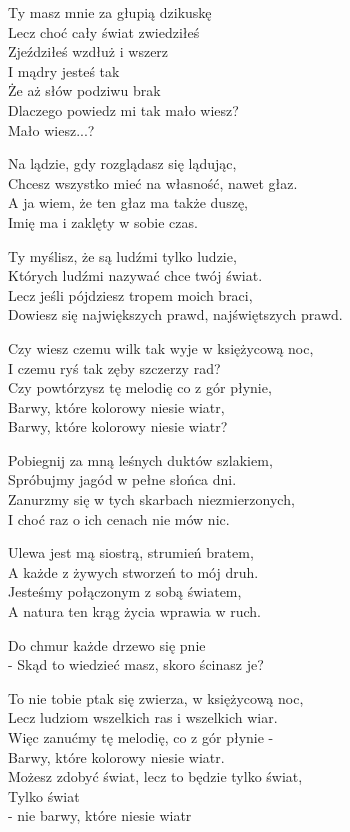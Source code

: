\begin{text}
    Ty masz mnie za głupią dzikuskę\\
    Lecz choć cały świat zwiedziłeś\\
    Zjeździłeś wzdłuż i wszerz\\
    I mądry jesteś tak\\
    Że aż słów podziwu brak\\
    Dlaczego powiedz mi tak mało wiesz?\\
    Mało wiesz...?

    Na lądzie, gdy rozglądasz się lądując,\\
    Chcesz wszystko mieć na własność, nawet głaz.\\
    A ja wiem, że ten głaz ma także duszę,\\
    Imię ma i zaklęty w sobie czas.

    Ty myślisz, że są ludźmi tylko ludzie,\\
    Których ludźmi nazywać chce twój świat.\\
    Lecz jeśli pójdziesz tropem moich braci,\\
    Dowiesz się największych prawd, najświętszych prawd.

    Czy wiesz czemu wilk tak wyje w księżycową noc,\\
    I czemu ryś tak zęby szczerzy rad?\\
    Czy powtórzysz tę melodię co z gór płynie,\\
    Barwy, które kolorowy niesie wiatr,\\
    Barwy, które kolorowy niesie wiatr?

    Pobiegnij za mną leśnych duktów szlakiem,\\
    Spróbujmy jagód w pełne słońca dni.\\
    Zanurzmy się w tych skarbach niezmierzonych,\\
    I choć raz o ich cenach nie mów nic.

    Ulewa jest mą siostrą, strumień bratem,\\
    A każde z żywych stworzeń to mój druh.\\
    Jesteśmy połączonym z sobą światem,\\
    A natura ten krąg życia wprawia w ruch.

    Do chmur każde drzewo się pnie\\
    - Skąd to wiedzieć masz, skoro ścinasz je?

    To nie tobie ptak się zwierza, w księżycową noc,\\
    Lecz ludziom wszelkich ras i wszelkich wiar.\\
    Więc zanućmy tę melodię, co z gór płynie -\\
    Barwy, które kolorowy niesie wiatr.\\
    Możesz zdobyć świat, lecz to będzie tylko świat,\\
    Tylko świat\\
    - nie barwy, które niesie wiatr
\end{text}
